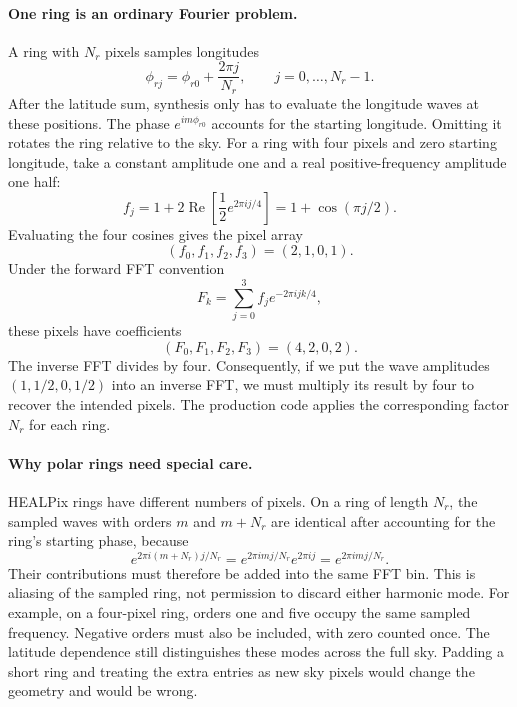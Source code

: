 \paragraph{One ring is an ordinary Fourier problem.}
A ring with $N_r$ pixels samples longitudes
\begin{equation}
 \phi_{rj}=\phi_{r0}+\frac{2\pi j}{N_r},\qquad j=0,\ldots,N_r-1.
\end{equation}
After the latitude sum, synthesis only has to evaluate the longitude
waves at these positions. The phase $e^{im\phi_{r0}}$ accounts for the
starting longitude. Omitting it rotates the ring relative to the sky.
For a ring with four pixels and zero starting longitude, take a constant
amplitude one and a real positive-frequency amplitude one half:
\begin{equation}
 f_j=1+2\operatorname{Re}\left[\frac12 e^{2\pi i j/4}\right]
    =1+\cos(\pi j/2).
\end{equation}
Evaluating the four cosines gives the pixel array
\begin{equation}
 (f_0,f_1,f_2,f_3)=(2,1,0,1).
\end{equation}
Under the forward FFT convention
\begin{equation}
 F_k=\sum_{j=0}^{3}f_j e^{-2\pi i jk/4},
\end{equation}
these pixels have coefficients
\begin{equation}
 (F_0,F_1,F_2,F_3)=(4,2,0,2).
\end{equation}
The inverse FFT divides by four. Consequently, if we put the wave
amplitudes $(1,1/2,0,1/2)$ into an inverse FFT, we must multiply its result
by four to recover the intended pixels. The production code applies the
corresponding factor $N_r$ for each ring.

\paragraph{Why polar rings need special care.}
HEALPix rings have different numbers of pixels. On a ring of length $N_r$,
the sampled waves with orders $m$ and $m+N_r$ are identical after accounting
for the ring's starting phase, because
\begin{equation}
 e^{2\pi i(m+N_r)j/N_r}=e^{2\pi imj/N_r}e^{2\pi ij}
                       =e^{2\pi imj/N_r}.
\end{equation}
Their contributions must therefore be added into the same FFT bin. This
is aliasing of the sampled ring, not permission to discard either harmonic
mode. For example, on a four-pixel ring, orders one and five occupy the
same sampled frequency. Negative orders must also be included, with zero
counted once. The latitude dependence still distinguishes these modes
across the full sky. Padding a short ring and treating the extra entries
as new sky pixels would change the geometry and would be wrong.

